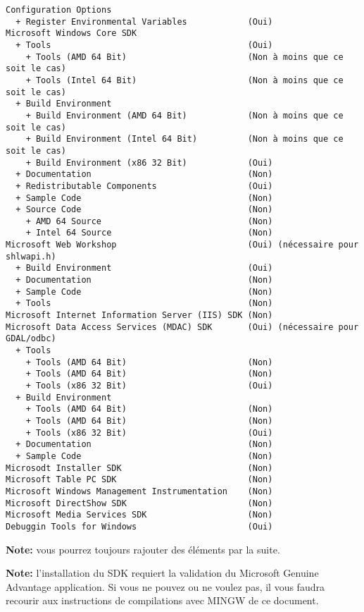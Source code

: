 \begin{verbatim}
Configuration Options
  + Register Environmental Variables            (Oui)
Microsoft Windows Core SDK
  + Tools                                       (Oui)
    + Tools (AMD 64 Bit)                        (Non à moins que ce soit le cas)
    + Tools (Intel 64 Bit)                      (Non à moins que ce soit le cas)
  + Build Environment
    + Build Environment (AMD 64 Bit)            (Non à moins que ce soit le cas)
    + Build Environment (Intel 64 Bit)          (Non à moins que ce soit le cas)
    + Build Environment (x86 32 Bit)            (Oui)
  + Documentation                               (Non)
  + Redistributable Components                  (Oui)
  + Sample Code                                 (Non)
  + Source Code                                 (Non)
    + AMD 64 Source                             (Non)
    + Intel 64 Source                           (Non)
Microsoft Web Workshop                          (Oui) (nécessaire pour shlwapi.h)
  + Build Environment                           (Oui)
  + Documentation                               (Non)
  + Sample Code                                 (Non)
  + Tools                                       (Non)
Microsoft Internet Information Server (IIS) SDK (Non)
Microsoft Data Access Services (MDAC) SDK       (Oui) (nécessaire pour GDAL/odbc)
  + Tools
    + Tools (AMD 64 Bit)                        (Non)
    + Tools (AMD 64 Bit)                        (Non)
    + Tools (x86 32 Bit)                        (Oui)
  + Build Environment
    + Tools (AMD 64 Bit)                        (Non)
    + Tools (AMD 64 Bit)                        (Non)
    + Tools (x86 32 Bit)                        (Oui)
  + Documentation                               (Non)
  + Sample Code                                 (Non)
Microsodt Installer SDK                         (Non)
Microsoft Table PC SDK                          (Non)
Microsoft Windows Management Instrumentation    (Non)
Microsoft DirectShow SDK                        (Non)
Microsoft Media Services SDK                    (Non)
Debuggin Tools for Windows                      (Oui)
\end{verbatim}

\textbf{Note:} vous pourrez toujours rajouter des éléments par la suite.

\textbf{Note:} l'installation du SDK requiert la validation du Microsoft Genuine Advantage application. Si vous ne pouvez ou ne voulez pas, il vous faudra recourir aux instructions de compilations avec MINGW  de ce document.

